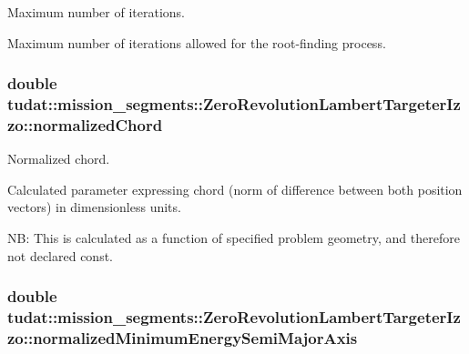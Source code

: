 Maximum number of iterations. 

Maximum number of iterations allowed for the root-\/finding process. 
\subsubsection[{\texorpdfstring{normalized\+Chord}{normalizedChord}}]{\setlength{\rightskip}{0pt plus 5cm}double tudat\+::mission\+\_\+segments\+::\+Zero\+Revolution\+Lambert\+Targeter\+Izzo\+::normalized\+Chord\hspace{0.3cm}{\ttfamily [protected]}}\hypertarget{classtudat_1_1mission__segments_1_1ZeroRevolutionLambertTargeterIzzo_a7f243a99425c70154c051269459046c9}{}\label{classtudat_1_1mission__segments_1_1ZeroRevolutionLambertTargeterIzzo_a7f243a99425c70154c051269459046c9}


Normalized chord. 

Calculated parameter expressing chord (norm of difference between both position vectors) in dimensionless units.

NB\+: This is calculated as a function of specified problem geometry, and therefore not declared const. 
\subsubsection[{\texorpdfstring{normalized\+Minimum\+Energy\+Semi\+Major\+Axis}{normalizedMinimumEnergySemiMajorAxis}}]{\setlength{\rightskip}{0pt plus 5cm}double tudat\+::mission\+\_\+segments\+::\+Zero\+Revolution\+Lambert\+Targeter\+Izzo\+::normalized\+Minimum\+Energy\+Semi\+Major\+Axis\hspace{0.3cm}{\ttfamily [protected]}}\hypertarget{classtudat_1_1mission__segments_1_1ZeroRevolutionLambertTargeterIzzo_addb8147855117bb086dd07f28b766f93}{}\label{classtudat_1_1mission__segments_1_1ZeroRevolutionLambertTargeterIzzo_addb8147855117bb086dd07f28b766f93}


